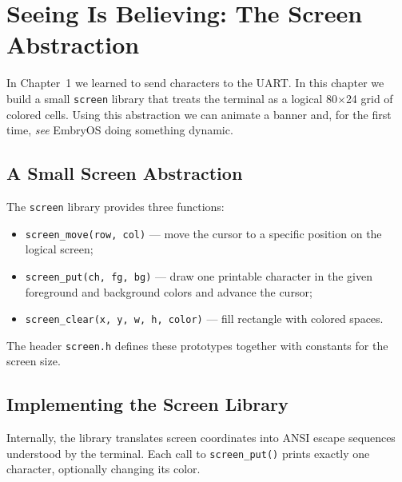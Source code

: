 \chapter{Seeing Is Believing: The Screen Abstraction}
\label{chap:textscreen}

In Chapter~1 we learned to send characters to the UART.  In this chapter we
build a small \texttt{screen} library that treats the terminal as a logical
80$\times$24 grid of colored cells.  Using this abstraction we can animate a
banner and, for the first time, \emph{see} EmbryOS doing something dynamic.

\section{A Small Screen Abstraction}

The \texttt{screen} library provides three functions:
\begin{itemize}
  \item \texttt{screen\_move(row, col)} --- move the cursor to a specific
        position on the logical screen;
  \item \texttt{screen\_put(ch, fg, bg)} --- draw one printable character in the
        given foreground and background colors and advance the cursor;
  \item \texttt{screen\_clear(x, y, w, h, color)} --- fill rectangle with colored spaces.
\end{itemize}
The header \texttt{screen.h} defines these prototypes together with constants
for the screen size.

\begin{figure}[H]
\centering
\begin{minipage}{0.7\textwidth}

\end{minipage}
\end{figure}

\section{Implementing the Screen Library}

Internally, the library translates screen coordinates into ANSI escape sequences
understood by the terminal.  Each call to \texttt{screen\_put()} prints exactly
one character, optionally changing its color.

\begin{figure}[H]
\centering
\begin{minipage}{0.9\textwidth}

\end{minipage}
\end{figure}

